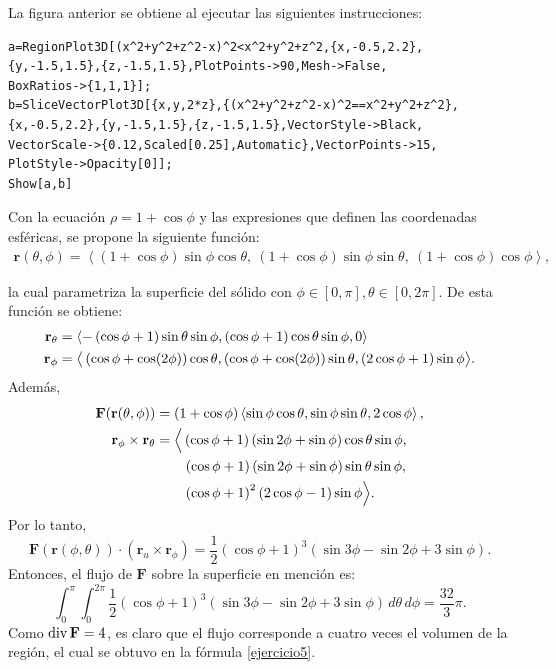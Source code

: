 \begin{parrafonumerado}
La figura anterior se obtiene al ejecutar las siguientes instrucciones:

\begin{tcolorbox}[title=\bf Instrucción \verb"Mathematica"]\begin{Verbatim}[formatcom=\letraverbatim]
a=RegionPlot3D[(x^2+y^2+z^2-x)^2<x^2+y^2+z^2,{x,-0.5,2.2},
{y,-1.5,1.5},{z,-1.5,1.5},PlotPoints->90,Mesh->False,
BoxRatios->{1,1,1}];
b=SliceVectorPlot3D[{x,y,2*z},{(x^2+y^2+z^2-x)^2==x^2+y^2+z^2},
{x,-0.5,2.2},{y,-1.5,1.5},{z,-1.5,1.5},VectorStyle->Black,
VectorScale->{0.12,Scaled[0.25],Automatic},VectorPoints->15,
PlotStyle->Opacity[0]];
Show[a,b]
\end{Verbatim}
\end{tcolorbox}

Con la ecuación \(\rho = 1 + \cos \phi\) y las expresiones que definen las coordenadas esféricas, se propone la siguiente función:
\begin{gather*}
\mathbf{r}(\theta,\phi) =
\left\langle
(1 + \cos \phi)\sin \phi \cos \theta,\
(1 + \cos \phi)\sin \phi \sin \theta,\
(1 + \cos \phi)\cos \phi
\right\rangle,
\end{gather*}

la cual parametriza la superficie del sólido con $\phi \in[0,\pi], \theta\in[0,2\pi]$.
De esta función se obtiene:
\begin{align*}
{\bf r}_{\theta} &= \left\langle -\left(\cos\phi +1\right)\sin\theta\sin\phi,(\cos \phi +1)\cos\theta\sin\phi,0\right\rangle \\
{\bf r}_{\phi } &= \big\langle \left( \cos \phi +\cos (2\phi) \right)\cos \theta , \left( \cos \phi +\cos (2\phi) \right)\sin \theta,
\left( 2\cos \phi +1\right)\sin \phi\big \rangle.
\end{align*}
Además,
\begin{align*}
{\bf F}({\bf r}(\theta,\phi)) & = (1+\cos\phi) \left\langle\sin\phi\cos\theta,\sin\phi\sin\theta,2\cos\phi\right\rangle,\\
{\bf r}_{\phi}\times {\bf r}_{\theta} & = \Big\langle\left(\cos\phi+1\right)\left(\sin2\phi+\sin\phi\right)\cos\theta\sin \phi,\\
& \qquad \left( \cos \phi +1\right) \left( \sin 2\phi +\sin \phi \right) \sin \theta \sin \phi ,\\
& \qquad \left( \cos \phi +1\right)^{2}\left( 2\cos \phi -1\right) \sin \phi \Big\rangle .
\end{align*}
Por lo tanto,
\[
\mathbf{F}(\mathbf{r}(\phi,\theta)) \cdot (\mathbf{r}_{u} \times \mathbf{r}_{\phi}) =
\frac{1}{2}(\cos \phi + 1)^{3} \left( \sin 3\phi - \sin 2\phi + 3\sin \phi \right).
\]
Entonces, el flujo de \(\mathbf{F}\) sobre la superficie en mención es:
\[
\int_{0}^{\pi} \int_{0}^{2\pi}
\frac{1}{2}(\cos \phi + 1)^{3} \left( \sin 3\phi - \sin 2\phi + 3\sin \phi \right)
\, d\theta\, d\phi = \frac{32}{3}\pi.
\]
Como $\operatorname{div}{\bf F} =4$, es claro que el flujo corresponde a cuatro veces el volumen de la región, el cual se obtuvo en la fórmula \ref{ejercicio5}.


\end{parrafonumerado}

